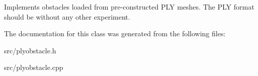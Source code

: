 Implements obstacles loaded from pre-\/constructed P\+LY meshes. The P\+LY format should be without any other experiment. 

The documentation for this class was generated from the following files\+:\begin{DoxyCompactItemize}
\item 
src/plyobstacle.\+h\item 
src/plyobstacle.\+cpp\end{DoxyCompactItemize}
